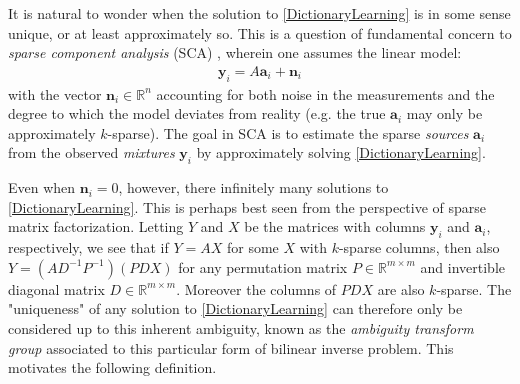 \documentclass[journal, onecolumn]{IEEEtran}
\begin{document}
It is natural to wonder when the solution to \eqref{DictionaryLearning} is in some sense unique, or at least approximately so. This is a question of fundamental concern to \emph{sparse component analysis} (SCA) \cite{Georgiev05}, wherein one assumes the linear model:
\begin{align}\label{LinearModel}
\mathbf{y}_i = A\mathbf{a}_i + \mathbf{n}_i 
\end{align}
%
with the vector $\mathbf{n}_i \in \mathbb{R}^n$ accounting for both noise in the measurements and the degree to which the model deviates from reality (e.g. the true $\mathbf{a}_i$ may only be approximately $k$-sparse). The goal in SCA is to estimate the sparse \emph{sources} $\mathbf{a}_i$ from the observed \emph{mixtures} $\mathbf{y}_i$ by approximately solving \eqref{DictionaryLearning}.

Even when $\mathbf{n}_i = 0$, however, there infinitely many solutions to \eqref{DictionaryLearning}. This is perhaps best seen from the perspective of sparse matrix factorization. Letting $Y$ and $X$ be the matrices with columns $\mathbf{y}_i$ and $\mathbf{a}_i$, respectively, we see that if $Y = AX$ for some $X$ with $k$-sparse columns, then also $Y = (AD^{-1}P^{-1})(PDX)$ for any permutation matrix $P \in \mathbb{R}^{m \times m}$ and invertible diagonal matrix $D \in \mathbb{R}^{m \times m}$. Moreover the columns of $PDX$ are also $k$-sparse. The "uniqueness" of any solution to \eqref{DictionaryLearning} can therefore only be considered up to this inherent ambiguity, known as the \emph{ambiguity transform group} associated to this particular form of bilinear inverse problem. This motivates the following definition.
\end{document}
